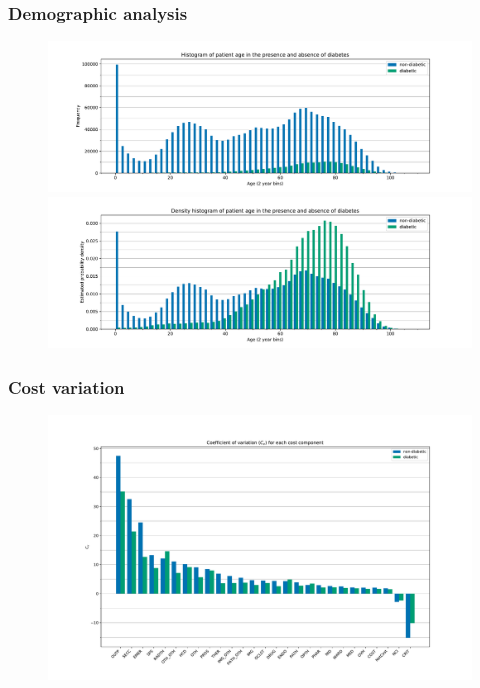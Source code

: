 \documentclass{beamer}
\begin{document}
\begin{frame}
    \frametitle{Demographic analysis}

    \begin{figure}
        \begin{minipage}{\linewidth}
        \includegraphics[width=\linewidth]{./img/diabetic_age_freq_hist.pdf}
        \end{minipage}
        \begin{minipage}{\linewidth}
        \includegraphics[width=\linewidth]{./img/diabetic_age_density_hist.pdf}
        \end{minipage}
    \end{figure}
\end{frame}

\begin{frame}
    \frametitle{Cost variation}

    \begin{figure}
        \includegraphics[width=\linewidth]{./img/diabetic_coeff_variation.pdf}
    \end{figure}
\end{frame}
\end{document}
